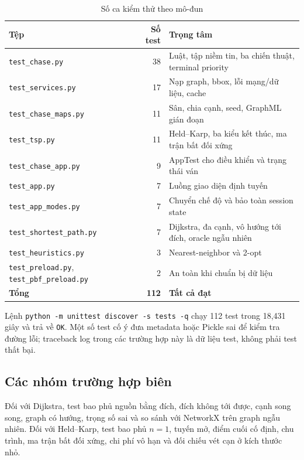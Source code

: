 \begin{table}[H]
\centering
\caption{Số ca kiểm thử theo mô-đun}
\begin{tabularx}{\linewidth}{Y r Y}
\toprule
\textbf{Tệp} & \textbf{Số test} & \textbf{Trọng tâm} \\
\midrule
\texttt{test\_chase.py} & 38 & Luật, tập niềm tin, ba chiến thuật, terminal priority \\
\texttt{test\_services.py} & 17 & Nạp graph, bbox, lỗi mạng/dữ liệu, cache \\
\texttt{test\_chase\_maps.py} & 11 & Sân, chia cạnh, seed, GraphML gián đoạn \\
\texttt{test\_tsp.py} & 11 & Held--Karp, ba kiểu kết thúc, ma trận bất đối xứng \\
\texttt{test\_chase\_app.py} & 9 & AppTest cho điều khiển và trạng thái ván \\
\texttt{test\_app.py} & 7 & Luồng giao diện định tuyến \\
\texttt{test\_app\_modes.py} & 7 & Chuyển chế độ và bảo toàn session state \\
\texttt{test\_shortest\_path.py} & 7 & Dijkstra, đa cạnh, vô hướng tới đích, oracle ngẫu nhiên \\
\texttt{test\_heuristics.py} & 3 & Nearest-neighbor và 2-opt \\
\texttt{test\_preload.py}, \texttt{test\_pbf\_preload.py} & 2 & An toàn khi chuẩn bị dữ liệu \\
\midrule
\textbf{Tổng} & \textbf{112} & \textbf{Tất cả đạt} \\
\bottomrule
\end{tabularx}
\end{table}

Lệnh \texttt{python -m unittest discover -s tests -q} chạy 112 test trong
18,431 giây và trả về \texttt{OK}. Một số test cố ý đưa metadata hoặc Pickle sai
để kiểm tra đường lỗi; traceback log trong các trường hợp này là dữ liệu test,
không phải test thất bại.

\subsection{Các nhóm trường hợp biên}

Đối với Dijkstra, test bao phủ nguồn bằng đích, đích không tới được, cạnh song
song, graph có hướng, trọng số sai và so sánh với NetworkX trên graph ngẫu nhiên.
Đối với Held--Karp, test bao phủ $n=1$, tuyến mở, điểm cuối cố định, chu trình,
ma trận bất đối xứng, chi phí vô hạn và đối chiếu vét cạn ở kích thước nhỏ.

